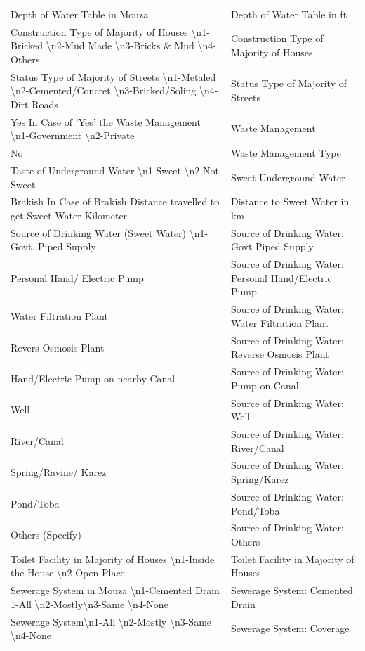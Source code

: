 \documentclass[10pt,a4paper]{article}
\begin{document}
\begin{longtable}{>{\raggedright\arraybackslash}p{7.5cm} >{\raggedright\arraybackslash}p{7.5cm}}
Depth of Water Table in Mouza & Depth of Water Table in ft \\

Construction Type of Majority of Houses \textbackslash n1-Bricked \textbackslash n2-Mud Made \textbackslash n3-Bricks \& Mud \textbackslash n4-Others & Construction Type of Majority of Houses \\
Status Type of Majority of Streets \textbackslash n1-Metaled \textbackslash n2-Cemented/Concret \textbackslash n3-Bricked/Soling \textbackslash n4-Dirt Roads & Status Type of Majority of Streets \\

Yes In Case of 'Yes' the Waste Management \textbackslash n1-Government \textbackslash n2-Private & Waste Management \\
No & Waste Management Type \\

Taste of Underground Water \textbackslash n1-Sweet \textbackslash n2-Not Sweet & Sweet Underground Water \\
Brakish In Case of Brakish Distance travelled to get Sweet Water Kilometer & Distance to Sweet Water in km \\

Source of Drinking Water (Sweet Water) \textbackslash n1-Govt. Piped Supply & Source of Drinking Water: Govt Piped Supply \\
Personal Hand/ Electric Pump & Source of Drinking Water: Personal Hand/Electric Pump \\
Water Filtration Plant & Source of Drinking Water: Water Filtration Plant \\
Revers Osmosis Plant & Source of Drinking Water: Reverse Osmosis Plant \\
Hand/Electric Pump on nearby Canal & Source of Drinking Water: Pump on Canal \\
Well & Source of Drinking Water: Well \\
River/Canal & Source of Drinking Water: River/Canal \\
Spring/Ravine/ Karez & Source of Drinking Water: Spring/Karez \\
Pond/Toba & Source of Drinking Water: Pond/Toba \\
Others (Specify) & Source of Drinking Water: Others \\

Toilet Facility in Majority of Houses \textbackslash n1-Inside the House \textbackslash n2-Open Place & Toilet Facility in Majority of Houses \\
Sewerage System in Mouza \textbackslash n1-Cemented Drain 1-All \textbackslash n2-Mostly\textbackslash n3-Same \textbackslash n4-None & Sewerage System: Cemented Drain \\
Sewerage System\textbackslash n1-All \textbackslash n2-Mostly \textbackslash n3-Same \textbackslash n4-None & Sewerage System: Coverage \\


\end{longtable}
\end{document}
